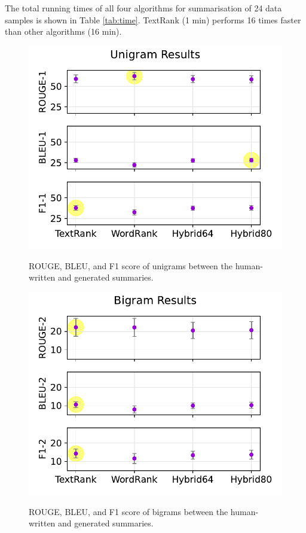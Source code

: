 \documentclass[11pt]{article}
\begin{document}
The total running times of all four algorithms for summarisation of 24 data samples is shown in Table \ref{tab:time}. TextRank (1 min) performs 16 times faster than other algorithms (16 min).

\begin{figure}[!h]
\centering
\includegraphics[scale = 0.5]{../figures/unigrams.pdf}
\label{fig:uni}
\caption{ROUGE, BLEU, and F1 score of unigrams between the human-written and generated summaries.}
\end{figure}

\begin{figure}[!h]
\centering
\includegraphics[scale = 0.5]{../figures/bigrams.pdf}
\label{fig:bi}
\caption{ROUGE, BLEU, and F1 score of bigrams between the human-written and generated summaries.}
\end{figure}
\end{document}
